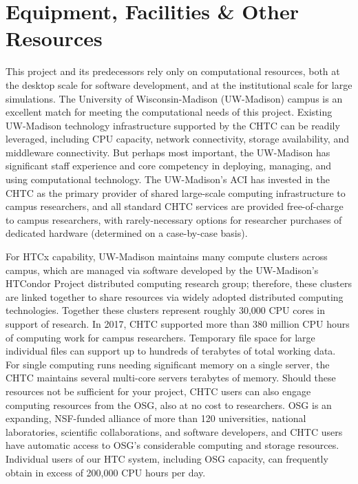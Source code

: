 \chapter{Equipment, Facilities \& Other Resources}


This project and its predecessors rely only on computational resources, both
at the desktop scale for software development, and at the institutional scale
for large simulations. The University of Wisconsin-Madison (UW-Madison) campus
is an excellent match for meeting the computational needs of this
project. Existing UW-Madison technology infrastructure supported by the
\gls{CHTC} can be readily leveraged, including CPU capacity, network
connectivity, storage availability, and middleware connectivity. But perhaps
most important, the UW-Madison has significant staff experience and core
competency in deploying, managing, and using computational technology. The
UW-Madison's \gls{ACI} has invested in the \gls{CHTC} as the primary provider
of shared large-scale computing infrastructure to campus researchers, and all
standard \gls{CHTC} services are provided free-of-charge to campus
researchers, with rarely-necessary options for researcher purchases of
dedicated hardware (determined on a case-by-case basis).

For \gls{HTC}x capability, UW-Madison maintains many compute clusters across
campus, which are managed via software developed by the UW-Madison's HTCondor
Project distributed computing research group; therefore, these clusters are
linked together to share resources via widely adopted distributed computing
technologies. Together these clusters represent roughly 30,000 CPU cores in
support of research. In 2017, \gls{CHTC} supported more than 380 million CPU
hours of computing work for campus researchers. Temporary file space for large
individual files can support up to hundreds of terabytes of total working
data. For single computing runs needing significant memory on a single server,
the \gls{CHTC} maintains several multi-core servers terabytes of
memory. Should these resources not be sufficient for your project, \gls{CHTC}
users can also engage computing resources from the \gls{OSG}, also at no cost
to researchers. \gls{OSG} is an expanding, NSF-funded alliance of more than
120 universities, national laboratories, scientific collaborations, and
software developers, and \gls{CHTC} users have automatic access to \gls{OSG}'s
considerable computing and storage resources. Individual users of our
\gls{HTC} system, including \gls{OSG} capacity, can frequently obtain in
excess of 200,000 CPU hours per day.

